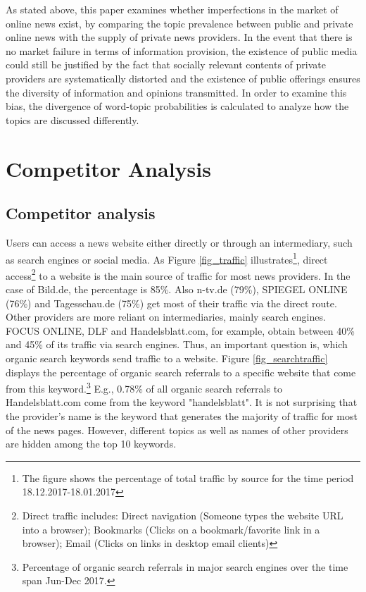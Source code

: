 \documentclass[12pt,a4paper,notitlepage]{article}
\begin{document}
As stated above, this paper examines whether imperfections in the market of online news exist, by comparing the topic prevalence between public and private online news with the supply of private news providers. In the event that there is no market failure in terms of information provision, the existence of public media could still be justified by the fact that socially relevant contents of private providers are systematically distorted and the existence of public offerings ensures the diversity of information and opinions transmitted. In order to examine this bias, the divergence of word-topic probabilities is calculated to analyze how the topics are discussed differently.

\section{Competitor Analysis}
\subsection{Competitor analysis}



Users can access a news website either directly or through an intermediary, such as search engines or social media.  As Figure \ref{fig_traffic} illustrates\footnote{The figure shows the percentage of total traffic by source for the time period 18.12.2017-18.01.2017}, direct access\footnote{Direct traffic includes: Direct navigation (Someone types the website URL into a browser); Bookmarks (Clicks on a bookmark/favorite link in a browser); Email (Clicks on links in desktop email clients)} to a website is the main source of traffic for most news providers. In the case of Bild.de, the percentage is 85\%. Also n-tv.de (79\%), SPIEGEL ONLINE (76\%) and Tagesschau.de (75\%) get most of their traffic via the direct route. Other providers are more reliant on intermediaries, mainly search engines. FOCUS ONLINE, DLF and Handelsblatt.com, for example, obtain between 40\% and 45\% of its traffic via search engines. Thus, an important question is, which organic search keywords send traffic to a website. Figure \ref{fig_searchtraffic} displays the percentage of organic search referrals to a specific website that come from this keyword.\footnote{Percentage of organic search referrals in major search engines over the time span Jun-Dec 2017.} E.g., 0.78\% of all organic search referrals to Handelsblatt.com come from the keyword "handelsblatt". It is not surprising that the provider's name is the keyword that generates the majority of traffic for most of the news pages. However, different topics as well as names of other providers are hidden among the top 10 keywords.   
\end{document}
